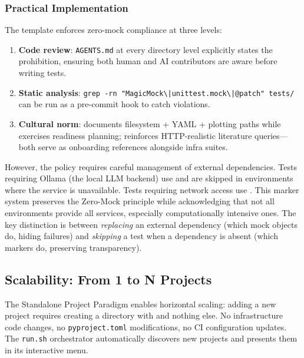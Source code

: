 \documentclass[
]{article}
\providecommand{\tightlist}{%
  \setlength{\itemsep}{0pt}\setlength{\parskip}{0pt}}
\begin{document}
\subsubsection{Practical Implementation}\label{practical-implementation}

The template enforces zero-mock compliance at three levels:

\begin{enumerate}
\def\labelenumi{\arabic{enumi}.}
\tightlist
\item
  \textbf{Code review}: \texttt{AGENTS.md} at every directory level
  explicitly states the prohibition, ensuring both human and AI
  contributors are aware before writing tests.
\item
  \textbf{Static analysis}:
  \texttt{grep\ -rn\ "MagicMock\textbackslash{}|{}unittest.mock\textbackslash{}|{}@patch"\ tests/}
  can be run as a pre-commit hook to catch violations.
\item
  \textbf{Cultural norm}:  documents
  filesystem + YAML + plotting paths while
   exercises readiness planning;
   reinforces HTTP-realistic
  literature queries---both serve as onboarding references alongside
  infra suites.
\end{enumerate}

However, the policy requires careful management of external
dependencies. Tests requiring Ollama (the local LLM backend) use
 and are skipped in environments
where the service is unavailable. Tests requiring network access use
. This marker system preserves the
Zero-Mock principle while acknowledging that not all environments
provide all services, especially computationally intensive ones. The key
distinction is between \emph{replacing} an external dependency (which
mock objects do, hiding failures) and \emph{skipping} a test when a
dependency is absent (which markers do, preserving transparency).

\newpage

\subsection{Scalability: From 1 to N
Projects}\label{scalability-from-1-to-n-projects}

The Standalone Project Paradigm enables horizontal scaling: adding a new
project requires creating a directory with
 and nothing else. No infrastructure code
changes, no \texttt{pyproject.toml} modifications, no CI configuration
updates. The \texttt{run.sh} orchestrator automatically discovers new
projects and presents them in its interactive menu.
\end{document}
